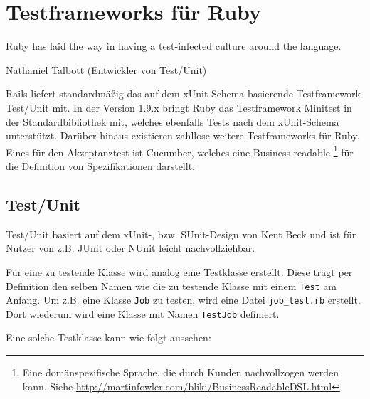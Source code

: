 \section{Testframeworks für Ruby}
\epigraph{Ruby has laid the way in having a test-infected culture around the language.}{Nathaniel Talbott (Entwickler von Test/Unit)}

Rails liefert standardmäßig das auf dem xUnit-Schema basierende Testframework Test/Unit mit. In der Version 1.9.x bringt Ruby das Testframework Minitest in der Standardbibliothek mit, welches ebenfalls Tests nach dem xUnit-Schema unterstützt. Darüber hinaus existieren zahllose weitere Testframeworks für Ruby. Eines für den Akzeptanztest ist Cucumber, welches eine Business-readable \footnote{Eine domänspezifische Sprache, die durch Kunden nachvollzogen werden kann. Siehe \url{http://martinfowler.com/bliki/BusinessReadableDSL.html}} für die Definition von Spezifikationen darstellt.
\subsection{Test/Unit}
Test/Unit basiert auf dem xUnit-, bzw. SUnit-Design von Kent Beck und ist für Nutzer von z.B. JUnit oder NUnit leicht nachvollziehbar.

Für eine zu testende Klasse wird analog eine Testklasse erstellt. Diese trägt per Definition den selben Namen wie die zu testende Klasse mit einem \texttt{Test} am Anfang. Um z.B. eine Klasse \texttt{Job} zu testen, wird eine Datei \texttt{job\_test.rb}  erstellt. Dort wiederum wird eine Klasse mit Namen \texttt{TestJob} definiert.


Eine solche Testklasse kann wie folgt aussehen:
\begin{ruby}[label=Testen mit Test/Unit]
 

   
   
      

   

   
       

       
\end{ruby}

